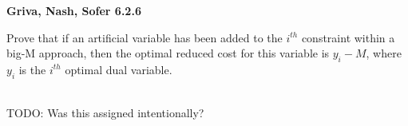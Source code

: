 \textbf{Griva, Nash, Sofer 6.2.6}

Prove that if an artificial variable has been added to the $i^{th}$ constraint within a big-M approach, then the optimal 
reduced cost for this variable is $y_i - M$, where $y_i$ is the $i^{th}$ optimal dual variable.

\begin{solution}
  \ \\

  TODO: Was this assigned intentionally?
  \vfill
\end{solution}
